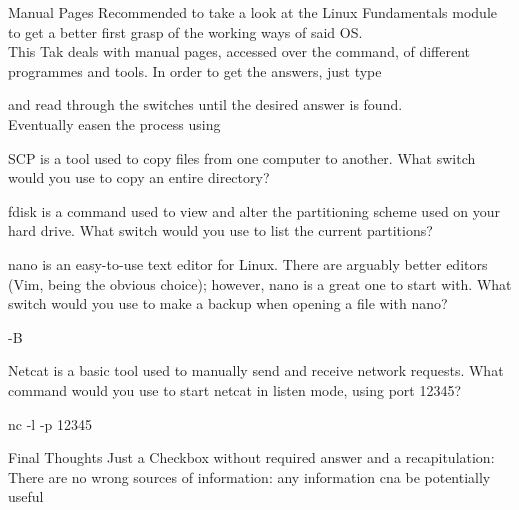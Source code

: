 \begin{task}{Manual Pages}
Recommended to take a look at the {Linux Fundamentals} module to get a better first grasp of the working ways of said OS.\\
This Tak deals with manual pages, accessed over the  command, of different programmes and tools. In order to get the answers, just type \begin{center}
 \end{center}
and read through the switches until the desired answer is found.\\ 
Eventually easen the process using \begin{center}
\end{center}
\begin{question}
SCP is a tool used to copy files from one computer to another.
What switch would you use to copy an entire directory?
\end{question}
\begin{answer}
\end{answer}
\begin{question}
fdisk is a command used to view and alter the partitioning scheme used on your hard drive.
What switch would you use to list the current partitions?
\end{question}
\begin{answer}
\end{answer}
\begin{question}
nano is an easy-to-use text editor for Linux. There are arguably better editors (Vim, being the obvious choice); however, nano is a great one to start with.
What switch would you use to make a backup when opening a file with nano?
\end{question}
\begin{answer}
-B
\end{answer}
\begin{question}
Netcat is a basic tool used to manually send and receive network requests. 
What command would you use to start netcat in listen mode, using port 12345?
\end{question}
\begin{answer}
nc -l -p 12345
\end{answer}

\end{task}
\begin{task}{Final Thoughts}
Just a Checkbox without required answer and a recapitulation: There are no wrong sources of information: any information cna be potentially useful
\end{task}